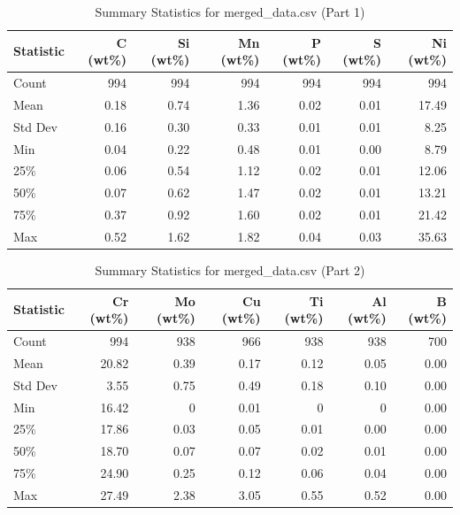 \documentclass[10pt]{article}
\begin{document}
\begin{table}[htbp]
\centering
\caption{Summary Statistics for merged\_data.csv (Part 1)}
\label{tab:summary_stats_part1}
\begin{tabular}{lrrrrrr}
\toprule
Statistic & C (wt\%) & Si (wt\%) & Mn (wt\%) & P (wt\%) & S (wt\%) & Ni (wt\%) \\
\midrule
Count & 994 & 994 & 994 & 994 & 994 & 994 \\
Mean & 0.18 & 0.74 & 1.36 & 0.02 & 0.01 & 17.49 \\
Std Dev & 0.16 & 0.30 & 0.33 & 0.01 & 0.01 & 8.25 \\
Min & 0.04 & 0.22 & 0.48 & 0.01 & 0.00 & 8.79 \\
25\% & 0.06 & 0.54 & 1.12 & 0.02 & 0.01 & 12.06 \\
50\% & 0.07 & 0.62 & 1.47 & 0.02 & 0.01 & 13.21 \\
75\% & 0.37 & 0.92 & 1.60 & 0.02 & 0.01 & 21.42 \\
Max & 0.52 & 1.62 & 1.82 & 0.04 & 0.03 & 35.63 \\
\bottomrule
\end{tabular}
\end{table}

\begin{table}[htbp]
\centering
\caption{Summary Statistics for merged\_data.csv (Part 2)}
\label{tab:summary_stats_part2}
\begin{tabular}{lrrrrrr}
\toprule
Statistic & Cr (wt\%) & Mo (wt\%) & Cu (wt\%) & Ti (wt\%) & Al (wt\%) & B (wt\%) \\
\midrule
Count & 994 & 938 & 966 & 938 & 938 & 700 \\
Mean & 20.82 & 0.39 & 0.17 & 0.12 & 0.05 & 0.00 \\
Std Dev & 3.55 & 0.75 & 0.49 & 0.18 & 0.10 & 0.00 \\
Min & 16.42 & 0 & 0.01 & 0 & 0 & 0.00 \\
25\% & 17.86 & 0.03 & 0.05 & 0.01 & 0.00 & 0.00 \\
50\% & 18.70 & 0.07 & 0.07 & 0.02 & 0.01 & 0.00 \\
75\% & 24.90 & 0.25 & 0.12 & 0.06 & 0.04 & 0.00 \\
Max & 27.49 & 2.38 & 3.05 & 0.55 & 0.52 & 0.00 \\
\bottomrule
\end{tabular}
\end{table}
\end{document}
